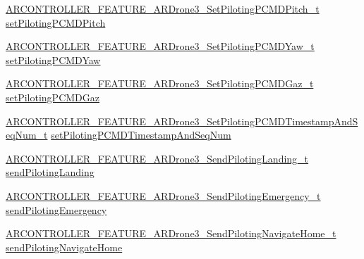 \begin{DoxyCompactItemize}
\item 
\hyperlink{_a_r_c_o_n_t_r_o_l_l_e_r___feature_8h_a0e94e71d9ef158b5c713eca6f5d44537}{A\+R\+C\+O\+N\+T\+R\+O\+L\+L\+E\+R\+\_\+\+F\+E\+A\+T\+U\+R\+E\+\_\+\+A\+R\+Drone3\+\_\+\+Set\+Piloting\+P\+C\+M\+D\+Pitch\+\_\+t} \hyperlink{struct_a_r_c_o_n_t_r_o_l_l_e_r___f_e_a_t_u_r_e___a_r_drone3__t_a4ec6db6e74a5aa36ee77fce7c8a2baf9}{set\+Piloting\+P\+C\+M\+D\+Pitch}
\item 
\hyperlink{_a_r_c_o_n_t_r_o_l_l_e_r___feature_8h_af131bd782d327b5a2875cd552087fccb}{A\+R\+C\+O\+N\+T\+R\+O\+L\+L\+E\+R\+\_\+\+F\+E\+A\+T\+U\+R\+E\+\_\+\+A\+R\+Drone3\+\_\+\+Set\+Piloting\+P\+C\+M\+D\+Yaw\+\_\+t} \hyperlink{struct_a_r_c_o_n_t_r_o_l_l_e_r___f_e_a_t_u_r_e___a_r_drone3__t_ab8213dda1eaaa1714330e236d335349b}{set\+Piloting\+P\+C\+M\+D\+Yaw}
\item 
\hyperlink{_a_r_c_o_n_t_r_o_l_l_e_r___feature_8h_a55660dfa6283ea009d947cb4d67cf9e8}{A\+R\+C\+O\+N\+T\+R\+O\+L\+L\+E\+R\+\_\+\+F\+E\+A\+T\+U\+R\+E\+\_\+\+A\+R\+Drone3\+\_\+\+Set\+Piloting\+P\+C\+M\+D\+Gaz\+\_\+t} \hyperlink{struct_a_r_c_o_n_t_r_o_l_l_e_r___f_e_a_t_u_r_e___a_r_drone3__t_a764dbce0cd40fac5205bee2434e7164d}{set\+Piloting\+P\+C\+M\+D\+Gaz}
\item 
\hyperlink{_a_r_c_o_n_t_r_o_l_l_e_r___feature_8h_aa82daba25a5c8f81e683ac3739b38d32}{A\+R\+C\+O\+N\+T\+R\+O\+L\+L\+E\+R\+\_\+\+F\+E\+A\+T\+U\+R\+E\+\_\+\+A\+R\+Drone3\+\_\+\+Set\+Piloting\+P\+C\+M\+D\+Timestamp\+And\+Seq\+Num\+\_\+t} \hyperlink{struct_a_r_c_o_n_t_r_o_l_l_e_r___f_e_a_t_u_r_e___a_r_drone3__t_a9098c38c4466bf6066d23a401c3c009e}{set\+Piloting\+P\+C\+M\+D\+Timestamp\+And\+Seq\+Num}
\item 
\hyperlink{_a_r_c_o_n_t_r_o_l_l_e_r___feature_8h_a8147962d512e889ba6a707136b2db5c3}{A\+R\+C\+O\+N\+T\+R\+O\+L\+L\+E\+R\+\_\+\+F\+E\+A\+T\+U\+R\+E\+\_\+\+A\+R\+Drone3\+\_\+\+Send\+Piloting\+Landing\+\_\+t} \hyperlink{struct_a_r_c_o_n_t_r_o_l_l_e_r___f_e_a_t_u_r_e___a_r_drone3__t_a02a6f627c8cf72b027322312f79637f2}{send\+Piloting\+Landing}
\item 
\hyperlink{_a_r_c_o_n_t_r_o_l_l_e_r___feature_8h_ad391dfc4500b9ade93ad2e1ac0199c25}{A\+R\+C\+O\+N\+T\+R\+O\+L\+L\+E\+R\+\_\+\+F\+E\+A\+T\+U\+R\+E\+\_\+\+A\+R\+Drone3\+\_\+\+Send\+Piloting\+Emergency\+\_\+t} \hyperlink{struct_a_r_c_o_n_t_r_o_l_l_e_r___f_e_a_t_u_r_e___a_r_drone3__t_a31563a6f827f5e153462602227b90468}{send\+Piloting\+Emergency}
\item 
\hyperlink{_a_r_c_o_n_t_r_o_l_l_e_r___feature_8h_a388424cd9f83af432b83d98a81d0da3a}{A\+R\+C\+O\+N\+T\+R\+O\+L\+L\+E\+R\+\_\+\+F\+E\+A\+T\+U\+R\+E\+\_\+\+A\+R\+Drone3\+\_\+\+Send\+Piloting\+Navigate\+Home\+\_\+t} \hyperlink{struct_a_r_c_o_n_t_r_o_l_l_e_r___f_e_a_t_u_r_e___a_r_drone3__t_a6a0618a4a26f2f1f5d8480903b780f62}{send\+Piloting\+Navigate\+Home}

\end{DoxyCompactItemize}
